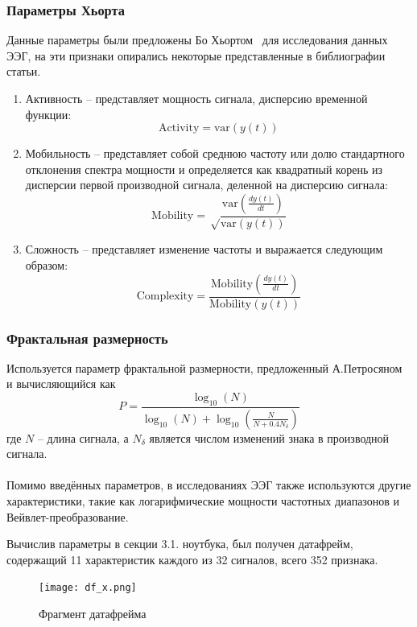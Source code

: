 \documentclass{article}
\begin{document}
\subsubsection{Параметры Хьорта}
Данные параметры были предложены Бо Хьортом~\cite{Hjorth} для исследования данных ЭЭГ, на эти признаки опирались некоторые представленные в библиографии статьи.
\begin{enumerate}
\item Активность -- представляет мощность сигнала, дисперсию временной функции:
$$\text{Activity}  =  \text{var}(y(t))$$

\item Мобильность -- представляет собой среднюю частоту или долю стандартного отклонения спектра мощности и определяется как квадратный корень из дисперсии первой производной сигнала, деленной на дисперсию сигнала:
$$\text{Mobility} =\sqrt\frac{{\text{var}(\frac{dy(t)}{dt})}}{\text{var}(y(t))}$$

\item Сложность -- представляет изменение частоты и выражается следующим образом:
$$\text{Complexity} =\frac{{\text{Mobility}(\frac{dy(t)}{dt})}}{\text{Mobility}(y(t))}$$
\end{enumerate}
\subsubsection{Фрактальная размерность}
Используется параметр фрактальной размерности, предложенный А.Петросяном~\cite{Petrosian} и вычисляющийся как
$$P = \frac{\log_{10}(N)}{\log_{10}(N) +
\log_{10}(\frac{N}{N+0.4N_{\delta}})}$$
где $N$ -- длина сигнала, а $N_{\delta}$ является числом изменений знака в производной сигнала.

\paragraph{} Помимо введённых параметров, в исследованиях ЭЭГ также используются другие характеристики, такие как логарифмические мощности частотных диапазонов\cite{Brunner} и Вейвлет-преобразование\cite{Petrantonakis}.

Вычислив параметры в секции 3.1. ноутбука, был получен датафрейм, содержащий 11 характеристик каждого из 32 сигналов, всего 352 признака.

\begin{figure}[h]
\centering
\texttt{[image: df\_x.png]}
\caption{Фрагмент датафрейма}
\end{figure}
\end{document}
